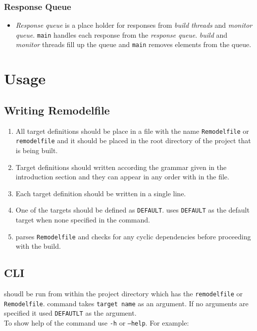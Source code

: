 \documentclass[12pt,letterpaper,titlepage, one-sided]{article}
\begin{document}
		\subsubsection{Response Queue}
		\begin{itemize}
		\item
		\textit{Response queue} is a place holder for responses from \textit{build threads} and \textit{monitor queue}. \texttt{main} handles each response from the \textit{response queue}. \textit{build} and \textit{monitor} threads fill up the queue and \texttt{main} removes elements from the queue.
		\end{itemize}
		
\section{Usage}
	\subsection{Writing Remodelfile}
	\begin{enumerate}
	\item
	All target definitions should be place in a file with the name \texttt{Remodelfile} or \texttt{remodelfile} and it should be placed in the root directory of the project that is being built.
	\item
	Target definitions should written according the grammar given in the introduction section and they can appear in any order with in the file. 
	\item
	Each target definition should be written in a single line.
	\item
	One of the targets should be defined as \texttt{DEFAULT}. \remodel uses \texttt{DEFAULT} as the default target when none specified in the command.
	\item
	\remodel parses \texttt{Remodelfile} and checks for any cyclic dependencies before proceeding with the build.
	\end{enumerate}
	
	\subsection{CLI}
	\remodel shoudl be run from within the project directory which has the \texttt{remodelfile} or \texttt{Remodelfile}. 
	\remodel command takes \texttt{target name} as an argument. If no arguments are specified it used \texttt{DEFAUTLT} as the argument.
	\\
	To show help of the command use \texttt{-h} or \texttt{--help}. For example:\\
\end{document}
